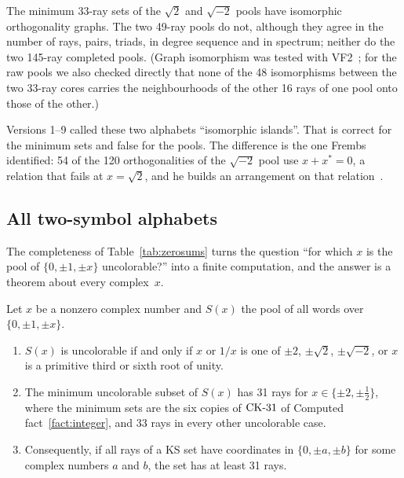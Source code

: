 \begin{fact}\label{fact:pools}
The minimum 33-ray sets of the $\sqrt2$ and $\sqrt{-2}$ pools have isomorphic orthogonality
graphs.  The two 49-ray pools do not, although they agree in the number of rays, pairs, triads,
in degree sequence and in spectrum; neither do the two 145-ray completed pools.  (Graph
isomorphism was tested with VF2~\cite{Cordella2004VF2}; for the raw pools we also checked directly
that none of the 48 isomorphisms between the two 33-ray cores carries the neighbourhoods of the
other 16 rays of one pool onto those of the other.)
\end{fact}

Versions 1--9 called these two alphabets ``isomorphic islands''.  That is correct for the
minimum sets and false for the pools.  The difference is the one Frembs identified: 54 of the 120
orthogonalities of the $\sqrt{-2}$ pool use $x+x^{*}=0$, a relation that fails at $x=\sqrt2$, and
he builds an arrangement on that relation~\cite{Frembs2026}.

\subsection{All two-symbol alphabets}\label{sec:twosymbol}

The completeness of Table~\ref{tab:zerosums} turns the question ``for which $x$ is the pool of
$\{0,\pm1,\pm x\}$ uncolorable?'' into a finite computation, and the answer is a theorem about
every complex~$x$.

\begin{theorem}\label{thm:twosymbol}
Let $x$ be a nonzero complex number and $S(x)$ the pool of all words over $\{0,\pm1,\pm x\}$.
\begin{enumerate}[label=(\roman*)]
\item $S(x)$ is uncolorable if and only if $x$ or $1/x$ is one of $\pm2$, $\pm\sqrt2$,
$\pm\sqrt{-2}$, or $x$ is a primitive third or sixth root of unity.
\item The minimum uncolorable subset of $S(x)$ has 31 rays for $x\in\{\pm2,\pm\tfrac12\}$, where
the minimum sets are the six copies of $\mathrm{CK}\text{-}31$ of Computed fact~\ref{fact:integer}, and 33 rays in
every other uncolorable case.
\item Consequently, if all rays of a KS set have coordinates in $\{0,\pm a,\pm b\}$ for some
complex numbers $a$ and $b$, the set has at least 31 rays.
\end{enumerate}
\end{theorem}

